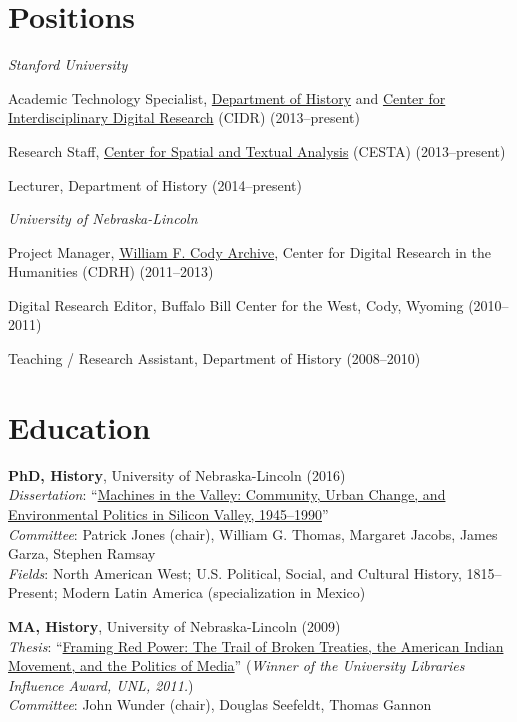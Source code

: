 \section{Positions}\label{positions}

\emph{Stanford University}

Academic Technology Specialist,
\href{http://history.stanford.edu}{Department of History} and
\href{http://cidr.stanford.edu}{Center for Interdisciplinary Digital
Research} (CIDR) (2013--present)

Research Staff, \href{http://cesta.stanford.edu}{Center for Spatial and
Textual Analysis} (CESTA) (2013--present)

Lecturer, Department of History (2014--present)

\vspace{0.5cm}

\emph{University of Nebraska-Lincoln}

Project Manager, \href{http://codyarchive.org}{William F. Cody Archive},
Center for Digital Research in the Humanities (CDRH) (2011--2013)

Digital Research Editor, Buffalo Bill Center for the West, Cody, Wyoming
(2010--2011)

Teaching / Research Assistant, Department of History (2008--2010)

\section{Education}\label{education}

\textbf{PhD, History}, University of Nebraska-Lincoln (2016)\\
\emph{Dissertation}:
``\href{http://digitalcommons.unl.edu/historydiss/86/}{Machines in the
Valley: Community, Urban Change, and Environmental Politics in Silicon
Valley, 1945--1990}''\\
\emph{Committee}: Patrick Jones (chair), William G. Thomas, Margaret
Jacobs, James Garza, Stephen Ramsay\\
\emph{Fields}: North American West; U.S. Political, Social, and Cultural
History, 1815--Present; Modern Latin America (specialization in Mexico)

\textbf{MA, History}, University of Nebraska-Lincoln (2009)\\
\emph{Thesis}:
``\href{http://digitalcommons.unl.edu/historydiss/21/}{Framing Red
Power: The Trail of Broken Treaties, the American Indian Movement, and
the Politics of Media}'' (\emph{Winner of the University Libraries
Influence Award, UNL, 2011.})\\
\emph{Committee}: John Wunder (chair), Douglas Seefeldt, Thomas Gannon

